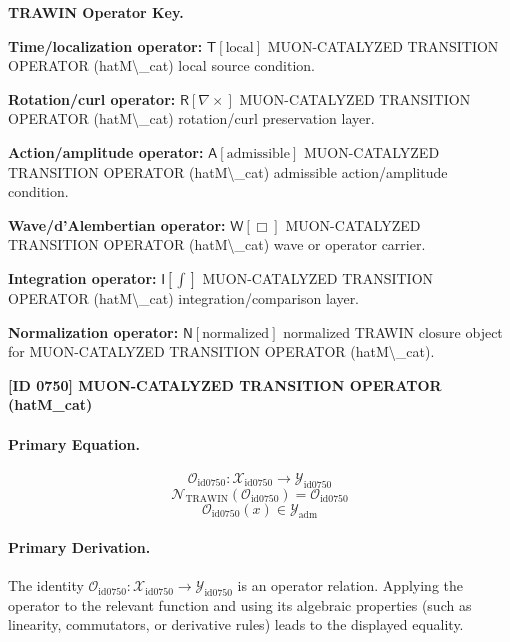 \par\vspace{0.45\baselineskip}
\noindent\begin{minipage}[t]{\linewidth}
\begingroup
\small
\raggedright
\textbf{TRAWIN Operator Key.}\par
\noindent\textbf{Time/localization operator:} $\mathsf{T}\!\left[\mathrm{local}\right]$ MUON-CATALYZED TRANSITION OPERATOR (hatM\textbackslash{}\_cat) local source condition.\par
\noindent\textbf{Rotation/curl operator:} $\mathsf{R}\!\left[\nabla\times\right]$ MUON-CATALYZED TRANSITION OPERATOR (hatM\textbackslash{}\_cat) rotation/curl preservation layer.\par
\noindent\textbf{Action/amplitude operator:} $\mathsf{A}\!\left[\mathrm{admissible}\right]$ MUON-CATALYZED TRANSITION OPERATOR (hatM\textbackslash{}\_cat) admissible action/amplitude condition.\par
\noindent\textbf{Wave/d'Alembertian operator:} $\mathsf{W}\!\left[\Box\right]$ MUON-CATALYZED TRANSITION OPERATOR (hatM\textbackslash{}\_cat) wave or operator carrier.\par
\noindent\textbf{Integration operator:} $\mathsf{I}\!\left[\int\right]$ MUON-CATALYZED TRANSITION OPERATOR (hatM\textbackslash{}\_cat) integration/comparison layer.\par
\noindent\textbf{Normalization operator:} $\mathsf{N}\!\left[\mathrm{normalized}\right]$ normalized TRAWIN closure object for MUON-CATALYZED TRANSITION OPERATOR (hatM\textbackslash{}\_cat).\par
\endgroup
\end{minipage}

\clearpage
\noindent\textbf{[ID 0750] MUON-CATALYZED TRANSITION OPERATOR (hatM\_cat)}\par
\vspace{0.35em}
\paragraph{Primary Equation.}
\[
\mathcal{O}_{\mathrm{id0750}}:\mathcal{X}_{\mathrm{id0750}}\longrightarrow\mathcal{Y}_{\mathrm{id0750}}
\]
\[
\mathcal{N}_{\mathrm{TRAWIN}}(\mathcal{O}_{\mathrm{id0750}})=\mathcal{O}_{\mathrm{id0750}}
\]
\[
\mathcal{O}_{\mathrm{id0750}}(x)\in\mathcal{Y}_{\mathrm{adm}}
\]

\paragraph{Primary Derivation.}
The identity \( \mathcal{O}_{\mathrm{id0750}}:\mathcal{X}_{\mathrm{id0750}}\longrightarrow\mathcal{Y}_{\mathrm{id0750}} \) is an operator relation. Applying the operator to the relevant function and using its algebraic properties (such as linearity, commutators, or derivative rules) leads to the displayed equality.
